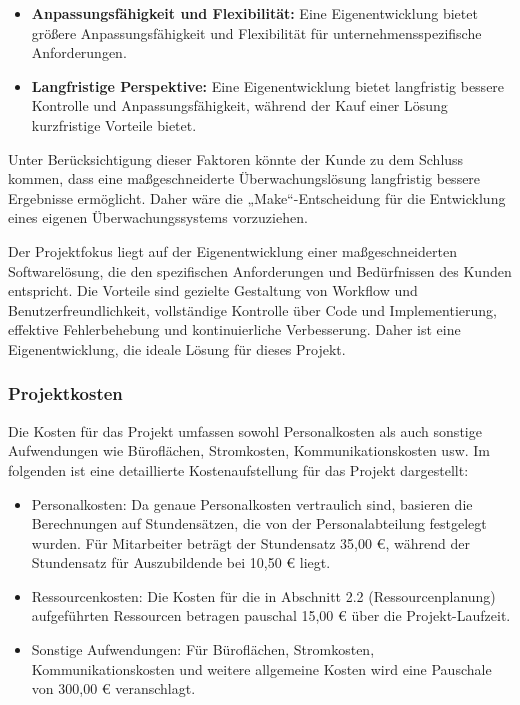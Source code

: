 \begin{flushleft}
\begin{itemize}
	\item \textbf{Anpassungsfähigkeit und Flexibilität:} Eine Eigenentwicklung bietet größere Anpassungsfähigkeit und Flexibilität für unternehmensspezifische Anforderungen.

	\item \textbf{Langfristige Perspektive:} Eine Eigenentwicklung bietet langfristig bessere Kontrolle und Anpassungsfähigkeit, während der Kauf einer Lösung kurzfristige Vorteile bietet.


	\end{itemize}

	Unter Berücksichtigung dieser Faktoren könnte der Kunde zu dem Schluss kommen, dass eine maßgeschneiderte Überwachungslösung langfristig bessere Ergebnisse ermöglicht. Daher wäre die „Make“-Entscheidung für die Entwicklung eines eigenen Überwachungssystems vorzuziehen.

	Der Projektfokus liegt auf der Eigenentwicklung einer maßgeschneiderten Softwarelösung, die den spezifischen Anforderungen und Bedürfnissen des Kunden entspricht. Die Vorteile sind gezielte Gestaltung von Workflow und Benutzerfreundlichkeit, vollständige Kontrolle über Code und Implementierung, effektive Fehlerbehebung und kontinuierliche Verbesserung. Daher ist eine Eigenentwicklung, die ideale Lösung für dieses Projekt.
		\subsubsection{Projektkosten}
		Die Kosten für das Projekt umfassen sowohl Personalkosten als auch sonstige Aufwendungen wie Büroflächen, Stromkosten, Kommunikationskosten usw. Im folgenden ist eine detaillierte Kostenaufstellung für das Projekt dargestellt:
		\begin{itemize}
			\item Personalkosten: Da genaue Personalkosten vertraulich sind, basieren die Berechnungen auf Stundensätzen, die von der Personalabteilung festgelegt wurden. Für Mitarbeiter beträgt der Stundensatz 35,00 €, während der Stundensatz für Auszubildende bei 10,50 € liegt.
			\item Ressourcenkosten: Die Kosten für die in Abschnitt 2.2 (Ressourcenplanung) aufgeführten Ressourcen betragen pauschal 15,00 € über die Projekt-Laufzeit.
			\item Sonstige Aufwendungen: Für Büroflächen, Stromkosten, Kommunikationskosten und weitere allgemeine Kosten wird eine Pauschale von 300,00 € veranschlagt.
		\end{itemize}


\end{flushleft}
